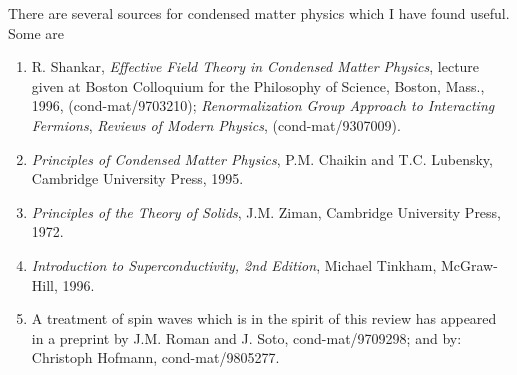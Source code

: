\documentclass[12pt,epsf]{report}
\begin{document}
There are several sources for condensed matter physics
which I have found useful. Some are

\begin{enumerate}

\item
R. Shankar, {\sl Effective Field Theory in Condensed Matter
Physics}, lecture given at Boston Colloquium for the
Philosophy of Science, Boston, Mass., 1996,
(cond-mat/9703210); {\sl Renormalization Group Approach to
Interacting Fermions}, {\it Reviews of Modern Physics},
(cond-mat/9307009).

\item
{\it Principles of Condensed Matter Physics}, P.M. Chaikin
and T.C. Lubensky, Cambridge University Press, 1995.

\item
{\it Principles of the Theory of Solids}, J.M. Ziman,
Cambridge University Press, 1972.

\item
{\it Introduction to Superconductivity, 2nd Edition},
Michael Tinkham, McGraw-Hill, 1996.

\item
A treatment of spin waves which is in the spirit of this
review has appeared in a preprint by J.M. Roman and J.
Soto, cond-mat/9709298; and by: Christoph Hofmann,
cond-mat/9805277.

\end{enumerate}
\end{document}
